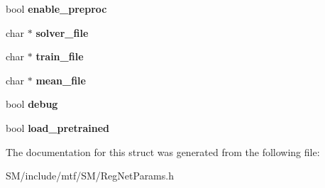 \begin{DoxyCompactItemize}
\item 
\hypertarget{structmtf_1_1RegNetParams_af771ac70a3854e60aa9b08d8f335264c}{bool {\bfseries enable\-\_\-preproc}}\label{structmtf_1_1RegNetParams_af771ac70a3854e60aa9b08d8f335264c}

\item 
\hypertarget{structmtf_1_1RegNetParams_ac4dfe5d754b3d5667a2a3991c908ab9e}{char $\ast$ {\bfseries solver\-\_\-file}}\label{structmtf_1_1RegNetParams_ac4dfe5d754b3d5667a2a3991c908ab9e}

\item 
\hypertarget{structmtf_1_1RegNetParams_aa17cbd58219881a0a0374e0dcf156e4c}{char $\ast$ {\bfseries train\-\_\-file}}\label{structmtf_1_1RegNetParams_aa17cbd58219881a0a0374e0dcf156e4c}

\item 
\hypertarget{structmtf_1_1RegNetParams_acc581074b09214236d6a87ac9aa61b69}{char $\ast$ {\bfseries mean\-\_\-file}}\label{structmtf_1_1RegNetParams_acc581074b09214236d6a87ac9aa61b69}

\item 
\hypertarget{structmtf_1_1RegNetParams_a57806c2b2a170d9df910983d566a3a86}{bool {\bfseries debug}}\label{structmtf_1_1RegNetParams_a57806c2b2a170d9df910983d566a3a86}

\item 
\hypertarget{structmtf_1_1RegNetParams_ad6ac8f73cb7454a7561ac1ba8780557c}{bool {\bfseries load\-\_\-pretrained}}\label{structmtf_1_1RegNetParams_ad6ac8f73cb7454a7561ac1ba8780557c}

\end{DoxyCompactItemize}


The documentation for this struct was generated from the following file\-:\begin{DoxyCompactItemize}
\item 
S\-M/include/mtf/\-S\-M/Reg\-Net\-Params.\-h\end{DoxyCompactItemize}
